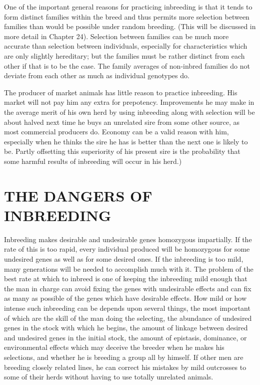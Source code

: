 One of the important general reasons for practicing inbreeding is
that it tends to form distinct families within the breed and thus permits
more selection between families than would be possible under random
breeding. (This will be discussed in more detail in Chapter 24). Selection
between families can be much more accurate than selection
between individuals, especially for characteristics which are only slightly
hereditary; but the families must be rather distinct from each other if
that is to be the case. The family averages of non-inbred families do not
deviate from each other as much as individual genotypes do.

The producer of market animals has little reason to practice
inbreeding. His market will not pay him any extra for prepotency.
Improvements he may make in the average merit of his own herd by
using inbreeding along with selection will be about halved next time he
buys an unrelated sire from some other source, as most commercial producers
do. Economy can be a valid reason with him, especially when he
thinks the sire he has is better than the next one is likely to be. Partly
offsetting this superiority of his present sire is the probability that
some harmful results of inbreeding will occur in his herd.)
\noclub
{}

\section*{THE DANGERS OF INBREEDING}

Inbreeding makes desirable and undesirable genes homozygous
impartially. If the rate of this is too rapid, every individual produced
will be homozygous for some undesired genes as well as for some desired
ones. If the inbreeding is too mild, many generations will be needed to
accomplish much with it. The problem of the best rate at which to
inbreed is one of keeping the inbreeding mild enough that the man in
charge can avoid fixing the genes with undesirable effects and can fix as
many as possible of the genes which have desirable effects. How mild or
how intense such inbreeding can be depends upon several things, the
most important of which are the skill of the man doing the selecting,
the abundance of undesired genes in the stock with which he begins, the
amount of linkage between desired and undesired genes in the initial
stock, the amount of epistasis, dominance, or environmental effects
which may deceive the breeder when he makes his selections, and
whether he is breeding a group all by himself. If other men are breeding
closely related lines, he can correct his mistakes by mild outcrosses
to some of their herds without having to use totally unrelated animals.

